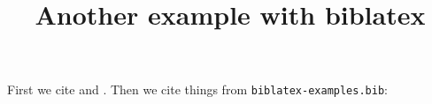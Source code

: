 \documentclass[biblatex]{iacrcc}
\title{Another example with biblatex}
\begin{document}
First we cite \cite{sample} and \cite{noemph}.
Then we cite things from \texttt{biblatex-examples.bib}: 
\cite{kowalik}
\cite{westfahl:space}
\cite{aksin}
\cite{angenendt}
\cite{baez/article}
\cite{bertram}
\cite{doody}
\cite{matuz:doody}
\cite{gillies}
\cite{glashow}
\cite{herrmann}
\cite{kastenholz}
\cite{murray}
\cite{reese}
\cite{sarfraz}
\cite{shore}
\cite{sigfridsson}
\cite{spiegelberg}
\cite{springer}
\cite{weinberg}
\cite{yoon}
\cite{augustine}
\cite{averroes/bland}
\cite{averroes/hannes}
\cite{averroes/hercz}
\cite{cicero}
\cite{coleridge}
\cite{companion}
\cite{cotton}
\cite{gerhardt}
\cite{gonzalez}
\cite{hammond}
\cite{iliad}
\cite{knuth:ct:a}
\cite{knuth:ct:b}
\cite{knuth:ct:c}
\cite{knuth:ct:d}
\cite{knuth:ct:e}
\cite{kullback}
\cite{kullback:reprint}
\cite{malinowski}
\cite{maron}
\cite{massa}
\cite{moore}
\cite{nietzsche:ksa}
\cite{nietzsche:ksa1}
\cite{nussbaum}
\cite{piccato}
\cite{vangennep}
\cite{vangennep:trans}
\cite{wilde}
\cite{worman}
\cite{britannica}
\cite{gaonkar}
\cite{gaonkar:in}
\cite{westfahl:frontier}
\cite{kant:kpv}
\cite{kant:ku}
\cite{nietzsche:historie}
\cite{brandt}
\cite{hyman}
\cite{pines}
\cite{salam}
\cite{cms}
\cite{baez/online}
\cite{ctan}
\cite{itzhaki}
\cite{markey}
\cite{wassenberg}
\cite{almendro}
\cite{kowalik}
\cite{laufenberg}
\cite{sorace}
\cite{jcg}
\cite{chiu}
\cite{padhye}
\cite{geer}
\cite{loh}

\printbibliography
\end{document}
